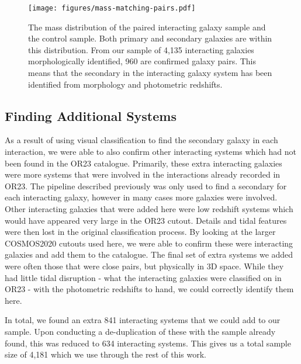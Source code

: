 \documentclass[fleqn,usenatbib]{mnras}
\begin{document}
\begin{figure}
    \centering
    \texttt{[image: figures/mass-matching-pairs.pdf]}
    \caption{The mass distribution of the paired interacting galaxy sample and the control sample. Both primary and secondary galaxies are within this distribution. From our sample of 4,135 interacting galaxies morphologically identified, 960 are confirmed galaxy pairs. This means that the secondary in the interacting galaxy system has been identified from morphology and photometric redshifts.}
    \label{fig:matched-distributions}
\end{figure}

\subsection{Finding Additional Systems}
\noindent As a result of using visual classification to find the secondary galaxy in each interaction, we were able to also confirm other interacting systems which had not been found in the OR23 catalogue. Primarily, these extra interacting galaxies were more systems that were involved in the interactions already recorded in OR23. The pipeline described previously was only used to find a secondary for each interacting galaxy, however in many cases more galaxies were involved. Other interacting galaxies that were added here were low redshift systems which would have appeared very large in the OR23 cutout. Details and tidal features were then lost in the original classification process. By looking at the larger COSMOS2020 cutouts used here, we were able to confirm these were interacting galaxies and add them to the catalogue. The final set of extra systems we added were often those that were close pairs, but physically in 3D space. While they had little tidal disruption - what the interacting galaxies were classified on in OR23 - with the photometric redshifts to hand, we could correctly identify them here.

In total, we found an extra 841 interacting systems that we could add to our sample. Upon conducting a de-duplication of these with the sample already found, this was reduced to 634 interacting systems. This gives us a total sample size of 4,181 which we use through the rest of this work.
\end{document}
